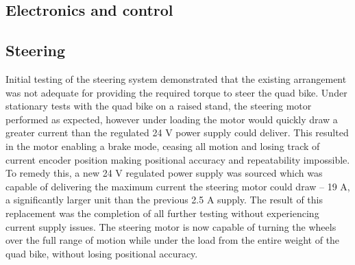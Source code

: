 \documentclass[main.tex]{subfiles}
\begin{document}
\subsection{Electronics and control}

\subsection{Steering}
Initial testing of the steering system demonstrated that the existing arrangement was not adequate for providing the required torque to steer the quad bike. Under stationary tests with the quad bike on a raised stand, the steering motor performed as expected, however under loading the motor would quickly draw a greater current than the regulated 24 V power supply could deliver. This resulted in the motor enabling a brake mode, ceasing all motion and losing track of current encoder position making positional accuracy and repeatability impossible. To remedy this, a new 24 V regulated power supply was sourced which was capable of delivering the maximum current the steering motor could draw – 19 A, a significantly larger unit than the previous 2.5 A supply. The result of this replacement was the completion of all further testing without experiencing current supply issues. The steering motor is now capable of turning the wheels over the full range of motion while under the load from the entire weight of the quad bike, without losing positional accuracy.
\end{document}
